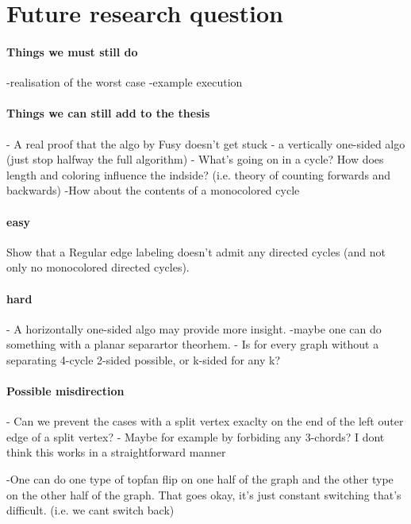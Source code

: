 \section{Future research question}

\paragraph{Things we must still do}
-realisation of the worst case
-example execution


\paragraph{Things we can still add to the thesis}
- A real proof that the algo by Fusy doesn't get stuck
- a vertically one-sided algo (just stop halfway the full algorithm)
- What's going on in a cycle? How does length and coloring influence the indside? (i.e. theory of counting forwards and backwards)
  -How about the contents of a monocolored cycle

\paragraph{easy}
Show that a Regular edge labeling doesn't admit any directed cycles (and not only no monocolored directed cycles).

\paragraph{hard}
- A horizontally one-sided algo may provide more insight.
-maybe one can do something with a planar separartor theorhem.
- Is for every graph without a separating 4-cycle 2-sided possible, or k-sided for any k?

\paragraph{Possible misdirection}
- Can we prevent the cases with a split vertex exaclty on the end of the left outer edge of a split vertex?
      - Maybe for example by forbiding any 3-chords? I dont think this works in a straightforward manner

-One can do one type of topfan flip on one half of the graph and the other type on the other half of the graph. That goes okay, it's just constant switching that's difficult. (i.e. we cant switch back)
